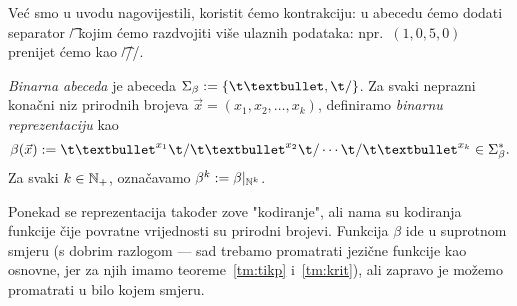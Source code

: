 
Već smo u uvodu nagovijestili, koristit ćemo kontrakciju: u abecedu ćemo dodati separator \t/ kojim ćemo razdvojiti više ulaznih podataka: npr.\ $(1,0,5,0)$ prenijet ćemo kao \t{\textbullet//\textbullet\textbullet\textbullet\textbullet\textbullet/}.

\begin{definicija}[{name=[binarna abeceda i binarna reprezentacija]}]\label{def:beta}
\emph{Binarna abeceda} je abeceda $\Sigma_\beta:=\{\t\textbullet,\t/\}$. Za svaki neprazni konačni niz prirodnih brojeva $\vec x=(x_1,x_2,\dotsc,x_k)$, definiramo \emph{binarnu reprezentaciju} kao
\begin{equation}\label{eq:betadef}
    \beta(\vec x):=\t\textbullet^{x_1}\t/\t\textbullet^{x_2}\t/\dotsm\t/\t\textbullet^{x_k}\in\Sigma_\beta^*\text.
\end{equation}
Za svaki $k\in{\mathbb N}_+$, označavamo $\beta^k:=\beta|_{{\mathbb N}^k}$.
\end{definicija}

Ponekad se reprezentacija također zove "kodiranje", ali nama su kodiranja funkcije čije povratne vrijednosti su prirodni brojevi. Funkcija $\beta$ ide u suprotnom smjeru (s dobrim razlogom --- sad trebamo promatrati jezične funkcije kao osnovne, jer za njih imamo teoreme~\ref{tm:tikp} i~\ref{tm:krit}), ali zapravo je možemo promatrati u bilo kojem smjeru.

